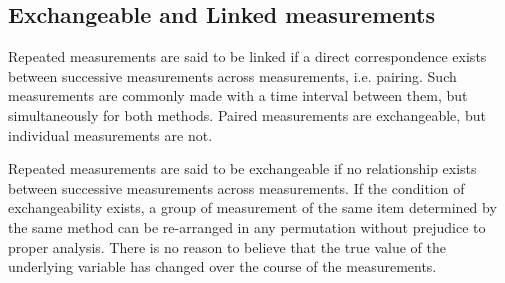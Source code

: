 \documentclass[12pt, a4paper]{report}
\theoremstyle{plain}
\theoremstyle{definition}
\theoremstyle{remark}
\begin{document}
%
%	
%
%	
%	
%
%	
%
%
%	
%
%	
%	
%	
%	
%	
%	
%	
%	
%
%	
%	

	\subsection{Exchangeable and Linked measurements}
	
	Repeated measurements are said to be linked if a direct correspondence exists between successive measurements across measurements, i.e. pairing. Such measurements are commonly made with a time interval between them, but simultaneously for both methods. Paired measurements are exchangeable, but individual measurements are not.
	
	Repeated measurements are said to be exchangeable if no relationship exists between successive measurements across measurements. If the condition of exchangeability exists, a group of measurement of the same item determined by the same method can be re-arranged in any permutation without prejudice to proper analysis. There is no reason to believe that the true value of the underlying variable has changed over the course of the measurements.
	
\end{document}
